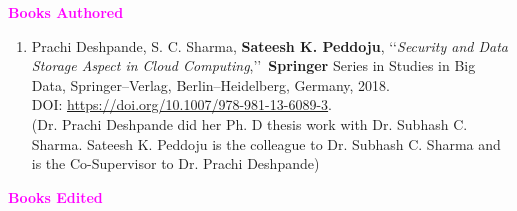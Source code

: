 
\begin{flushleft}
	\textbf{\textcolor{magenta}{Books Authored}} 
\end{flushleft}


\begin{enumerate}%
\item%
Prachi Deshpande, S. C. Sharma, \textbf{Sateesh K. Peddoju},
\lq\lq \emph{Security and Data Storage Aspect in Cloud Computing},\rq\rq\, \textbf{Springer} Series in
Studies in Big Data, Springer--Verlag, Berlin--Heidelberg,
Germany, 2018. \\DOI: \url{https://doi.org/10.1007/978-981-13-6089-3}. 
\\(Dr. Prachi Deshpande did her Ph. D thesis work with Dr. Subhash C. Sharma. Sateesh K. Peddoju is the colleague to Dr. Subhash C. Sharma and is the Co-Supervisor to Dr. Prachi Deshpande)
\end{enumerate}

\begin{flushleft}
	\textbf{\textcolor{magenta}{Books Edited}} 
\end{flushleft}

